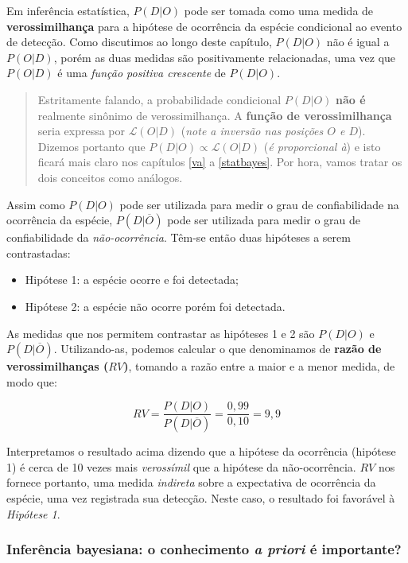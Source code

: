 \documentclass[
]{book}
\begin{document}
Em inferência estatística, \(P(D|O)\) pode ser tomada como uma medida de \textbf{verossimilhança} para a hipótese de ocorrência da espécie condicional ao evento de detecção. Como discutimos ao longo deste capítulo, \(P(D|O)\) não é igual a \(P(O|D)\), porém as duas medidas são positivamente relacionadas, uma vez que \(P(O|D)\) é uma \emph{função positiva crescente} de \(P(D|O)\).

\begin{quote}
Estritamente falando, a probabilidade condicional \(P(D|O)\) \textbf{não é} realmente sinônimo de verossimilhança. A \textbf{função de verossimilhança} seria expressa por \(\mathcal{L}(O|D)\) (\emph{note a inversão nas posições \(O\) e \(D\)}). Dizemos portanto que \(P(D|O) \propto \mathcal{L}(O|D)\) (\emph{é proporcional à}) e isto ficará mais claro nos capítulos \ref{va} a \ref{statbayes}. Por hora, vamos tratar os dois conceitos como análogos.
\end{quote}

Assim como \(P(D|O)\) pode ser utilizada para medir o grau de confiabilidade na ocorrência da espécie, \(P(D|\overline{O})\) pode ser utilizada para medir o grau de confiabilidade da \emph{não-ocorrência}. Têm-se então duas hipóteses a serem contrastadas:

\begin{itemize}
\item
  Hipótese 1: a espécie ocorre e foi detectada;
\item
  Hipótese 2: a espécie não ocorre porém foi detectada.
\end{itemize}

As medidas que nos permitem contrastar as hipóteses 1 e 2 são \(P(D|O)\) e \(P(D|\overline{O})\). Utilizando-as, podemos calcular o que denominamos de \textbf{razão de verossimilhanças (\(RV\))}, tomando a razão entre a maior e a menor medida, de modo que:

\[RV = \frac{P(D|O)}{P(D|\overline{O})} = \frac{0,99}{0,10} = 9,9\]

Interpretamos o resultado acima dizendo que a hipótese da ocorrência (hipótese 1) é cerca de 10 vezes mais \emph{verossímil} que a hipótese da não-ocorrência. \(RV\) nos fornece portanto, uma medida \emph{indireta} sobre a expectativa de ocorrência da espécie, uma vez registrada sua detecção. Neste caso, o resultado foi favorável à \emph{Hipótese 1}.

\hypertarget{inferuxeancia-bayesiana-o-conhecimento-a-priori-uxe9-importante}{%
\subsubsection*{\texorpdfstring{Inferência bayesiana: o conhecimento \emph{a priori} é importante?}{Inferência bayesiana: o conhecimento a priori é importante?}}\label{inferuxeancia-bayesiana-o-conhecimento-a-priori-uxe9-importante}}
\end{document}
